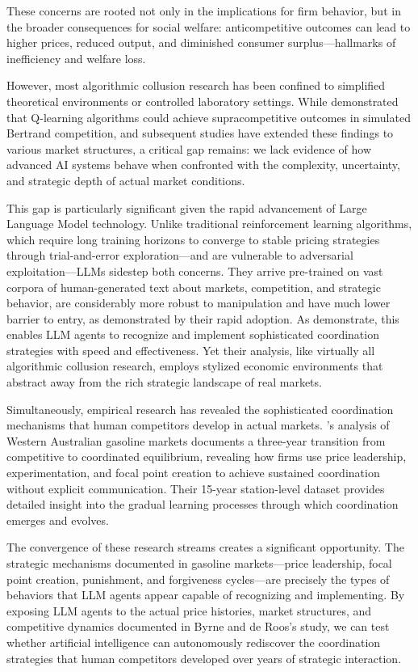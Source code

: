 These concerns are rooted not only in the implications for firm behavior, but in the broader consequences for social welfare: anticompetitive outcomes can lead to higher prices, reduced output, and diminished consumer surplus—hallmarks of inefficiency and welfare loss.

However, most algorithmic collusion research has been confined to simplified theoretical environments or controlled laboratory settings. While \textcite{calvano_artificial_2020} demonstrated that Q-learning algorithms could achieve supracompetitive outcomes in simulated Bertrand competition, and subsequent studies have extended these findings to various market structures, a critical gap remains: we lack evidence of how advanced AI systems behave when confronted with the complexity, uncertainty, and strategic depth of actual market conditions.

This gap is particularly significant given the rapid advancement of Large Language Model technology. Unlike traditional reinforcement learning algorithms, which require long training horizons to converge to stable pricing strategies through trial-and-error exploration—and are vulnerable to adversarial exploitation—LLMs sidestep both concerns. They arrive pre-trained on vast corpora of human-generated text about markets, competition, and strategic behavior, are considerably more robust to manipulation and have much lower barrier to entry, as demonstrated by their rapid adoption. As \textcite{fish_algorithmic_2025} demonstrate, this enables LLM agents to recognize and implement sophisticated coordination strategies with speed and effectiveness. Yet their analysis, like virtually all algorithmic collusion research, employs stylized economic environments that abstract away from the rich strategic landscape of real markets.

Simultaneously, empirical research has revealed the sophisticated coordination mechanisms that human competitors develop in actual markets. \textcite{byrne_learning_2019}'s analysis of Western Australian gasoline markets documents a three-year transition from competitive to coordinated equilibrium, revealing how firms use price leadership, experimentation, and focal point creation to achieve sustained coordination without explicit communication. Their 15-year station-level dataset provides detailed insight into the gradual learning processes through which coordination emerges and evolves.

The convergence of these research streams creates a significant opportunity. The strategic mechanisms documented in gasoline markets—price leadership, focal point creation, punishment, and forgiveness cycles—are precisely the types of behaviors that LLM agents appear capable of recognizing and implementing. By exposing LLM agents to the actual price histories, market structures, and competitive dynamics documented in Byrne and de Roos's study, we can test whether artificial intelligence can autonomously rediscover the coordination strategies that human competitors developed over years of strategic interaction.

